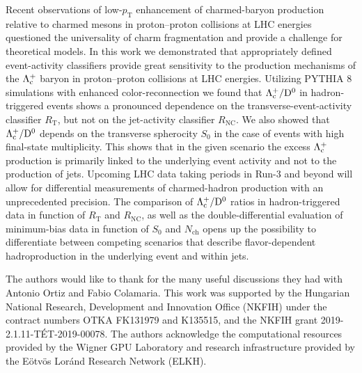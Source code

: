 \documentclass[aps,amsmath,amssymb,a4paper,11pt,superscriptaddress]{revtex4-2}
\newcommand*{\Nch}{\ensuremath{N_\mathrm{ch}}\xspace}
\newcommand*{\RT}{\ensuremath{R_\mathrm{T}}\xspace}
\newcommand*{\RNC}{\ensuremath{R_\mathrm{NC}}\xspace}
\newcommand*{\pT}{\ensuremath{p_\mathrm{T}}\xspace}
\newcommand*{\Lc}{\ensuremath{\Lambda_{\rm c}^+}\xspace}
\newcommand*{\LcToDz}{\ensuremath{{\Lambda_{\rm c}^+}/{\rm D^0}}\xspace}
\begin{document}
Recent observations of low-\pT enhancement of charmed-baryon production relative to charmed mesons in proton--proton collisions at LHC energies questioned the universality of charm fragmentation and provide a challenge for theoretical models. 
In this work we demonstrated that appropriately defined event-activity classifiers provide great sensitivity to the production mechanisms of the \Lc baryon in proton--proton collisions at LHC energies.
Utilizing PYTHIA 8 simulations with enhanced color-reconnection we found that \LcToDz in hadron-triggered events shows a pronounced dependence on the transverse-event-activity classifier \RT, but not on the jet-activity classifier \RNC. We also showed that \LcToDz depends on the transverse spherocity $S_0$ in the case of events with high final-state multiplicity.
This shows that in the given scenario the excess \Lc production is primarily linked to the underlying event activity and not to the production of jets. Upcoming LHC data taking periods in Run-3 and beyond will allow for differential measurements of charmed-hadron production with an unprecedented precision. The comparison of \LcToDz ratios in hadron-triggered data in function of \RT and \RNC, as well as the double-differential evaluation of minimum-bias data in function of $S_0$ and \Nch opens up the possibility to differentiate between competing scenarios that describe flavor-dependent hadroproduction in the underlying event and within jets. 

\begin{acknowledgments}
The authors would like to thank for the many useful discussions they had with Antonio Ortiz and Fabio Colamaria. This work was supported by the Hungarian National Research, Development and Innovation Office (NKFIH) under the contract numbers OTKA FK131979 and K135515, and the NKFIH grant 2019-2.1.11-T\'ET-2019-00078. 
The authors acknowledge the computational resources provided by the Wigner GPU Laboratory and research infrastructure provided by the E\"otv\"os Lor\'and Research Network (ELKH).
\end{acknowledgments}

\nocite{*}

\end{document}
